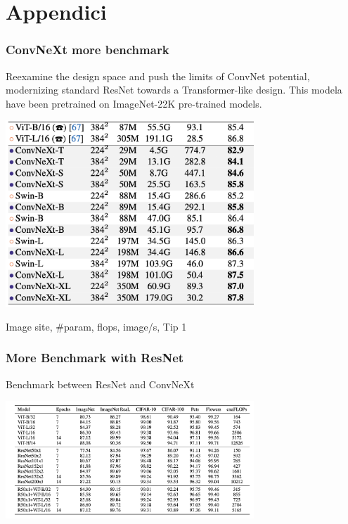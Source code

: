 \section{Appendici}

\begin{frame}
\frametitle{ConvNeXt more benchmark}
Reexamine the design space and push the limits of ConvNet potential, modernizing  standard ResNet towards a Transformer-like design.
This modela have been pretrained on ImageNet-22K pre-trained models.

\begin{center}
    \includegraphics[width=0.7\textwidth]{img/4-section/ConvNext2.png}
\end{center}

Image site, #param, flops, image/s, Tip 1

\end{frame}


\begin{frame}
\frametitle{More Benchmark with ResNet}
Benchmark between ResNet and ConvNeXt
\begin{center}
    \includegraphics[width=0.7\textwidth]{img/4-section/More-benchmark.png}
\end{center}

\end{frame}

